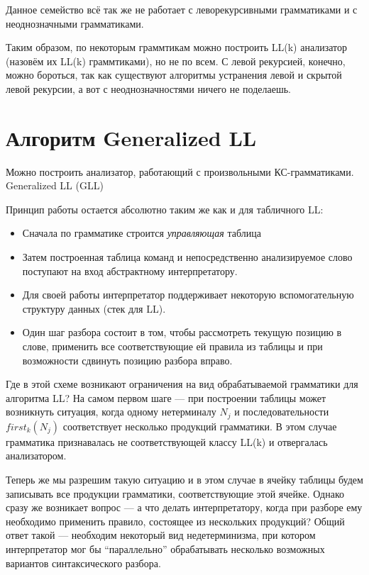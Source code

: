 Данное семейство всё так же не работает с леворекурсивными грамматиками и с неоднозначными грамматиками.

Таким образом, по некоторым граммтикам можно построить LL(k) анализатор (назовём их LL(k) граммтиками), но не по всем.
С левой рекурсией, конечно, можно бороться, так как существуют алгоритмы устранения левой и скрытой левой рекурсии, а вот с неоднозначностями ничего не поделаешь.



\section{Алгоритм Generalized LL}

Можно построить анализатор, работающий с произвольными КС-грамматиками.
Generalized LL (GLL)~\cite{Scott:2010:GP:1860132.1860320,10.1007/978-3-662-46663-6_5}

Принцип работы остается абсолютно таким же как и для табличного LL:
\begin{itemize}
  \item Сначала по грамматике строится \textit{управляющая} таблица
  \item Затем построенная таблица команд и непосредственно анализируемое слово поступают на вход абстрактному интерпретатору.
  \item Для своей работы интерпретатор поддерживает некоторую вспомогательную структуру данных (стек для LL).
  \item Один шаг разбора состоит в том, чтобы рассмотреть текущую позицию в слове, применить все соответствующие ей правила из таблицы и при возможности сдвинуть позицию разбора вправо.
\end{itemize}

Где в этой схеме возникают ограничения на вид обрабатываемой грамматики для алгоритма LL? На самом первом шаге --- при построении таблицы может возникнуть ситуация, когда одному нетерминалу $N_j$ и последовательности $first_k(N_j)$ соответствует несколько продукций грамматики. В этом случае грамматика признавалась не соответствующей классу LL(k) и отвергалась анализатором.

Теперь же мы разрешим такую ситуацию и в этом случае в ячейку таблицы будем записывать все продукции грамматики, соответствующие этой ячейке. Однако сразу же возникает вопрос --- а что делать интерпретатору, когда при разборе ему необходимо применить правило, состоящее из нескольких продукций? Общий ответ такой --- необходим некоторый вид недетерминизма, при котором интерпретатор мог бы ``параллельно'' обрабатывать несколько возможных вариантов синтаксического разбора.

